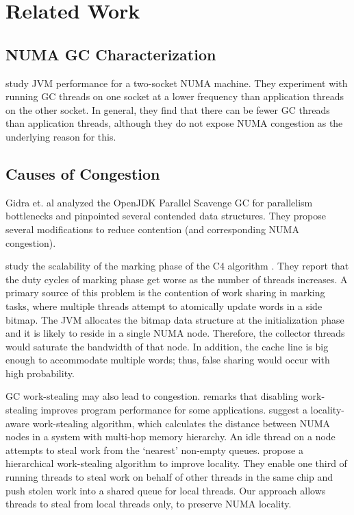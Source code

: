 \section{Related Work}
\label{sec:relw}

\subsection{NUMA GC Characterization}

\cite{sartor12exploring}
study JVM performance for a two-socket NUMA machine. They experiment with running
GC threads on one socket at a lower frequency than application threads on the 
other socket. In general, they find that there can be fewer GC threads than application threads, although they do not expose NUMA congestion as the 
underlying reason for this.

\subsection{Causes of Congestion}

Gidra et. al \cite{Gidra2013} analyzed the OpenJDK Parallel Scavenge GC for parallelism bottlenecks and pinpointed several contended data structures. They propose several modifications to reduce contention (and corresponding NUMA congestion).

\cite{iyengar2012scalable} study the scalability of the marking phase of the C4 algorithm \cite{Tene2011}.
They report that the duty cycles of marking phase get worse as the number of threads increases.
A primary source of this problem is the contention of work sharing in marking tasks, where multiple threads attempt to atomically update words in a side bitmap.
The JVM allocates the bitmap data structure at the initialization phase and it is likely to reside in a single NUMA node.
Therefore, the collector threads would saturate the bandwidth of that node.
In addition, the cache line is big enough to accommodate multiple words; thus, false sharing would occur with high probability.

GC work-stealing may also lead to congestion.
\cite{gidra11assessing} remarks that disabling work-stealing improves program performance for some applications.
\cite{Muddukrishna2013} suggest a locality-aware work-stealing algorithm, which calculates the distance between NUMA nodes in a system with multi-hop memory hierarchy.
An idle thread on a node attempts to steal work from the `nearest' non-empty queues.
\cite{Olivier2011} propose a hierarchical work-stealing algorithm to improve locality.
They enable one third of running threads to steal work on behalf of other threads in the same chip and push stolen work into a shared queue for local threads.
Our approach allows threads to steal from local threads only, to preserve NUMA locality.

